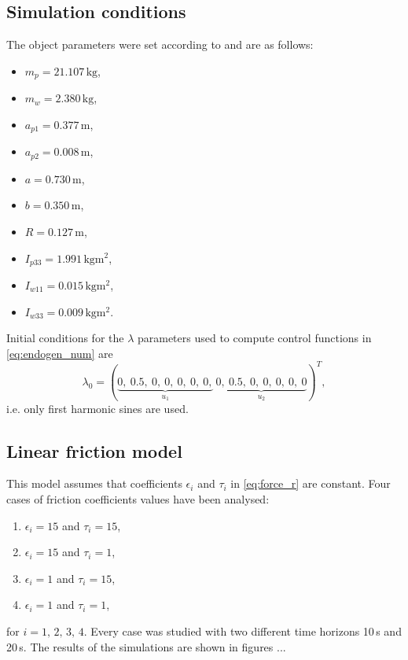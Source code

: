 \subsection{Simulation conditions}
\label{sec:pltf_params}
The object parameters were set according to \cite{coupled} and are as follows:
\begin{multicols}{2}
\begin{itemize}
\item $m_p = 21.107\,\mathrm{kg}$,
\item $m_w = 2.380\,\mathrm{kg}$,
\item $a_{p1} = 0.377\,\mathrm{m}$,
\item $a_{p2} = 0.008\,\mathrm{m}$,
\item $a = 0.730\,\mathrm{m}$,
\item $b = 0.350\,\mathrm{m}$,
\item $R = 0.127\,\mathrm{m}$,
\item $I_{p33} = 1.991\,\mathrm{kgm^2}$,
\item $I_{w11} = 0.015\,\mathrm{kgm^2}$,
\item $I_{w33} = 0.009\,\mathrm{kgm^2}$.
\end{itemize}
\end{multicols}
\setcounter{MaxMatrixCols}{14}
Initial conditions for the $\lambda$ parameters used to compute control functions
in \eqref{eq:endogen_num} are
\begin{equation}
\lambda_0=
(\underbrace{0, \ 0.5, \ 0, \ 0, \ 0, \ 0, \ 0,}_{u_1}\ \underbrace{0, \ 0.5, \ 0, \ 0, \ 0, \ 0, \ 0}_{u_2})^T,
\end{equation}
i.e. only first harmonic sines are used.
 	

\subsection{Linear friction model}
This model assumes that coefficients $\epsilon_i$ and $\tau_i$ in \eqref{eq:force_r} are constant. Four cases of friction coefficients values have been analysed:
\begin{enumerate}
\item $\epsilon_i=15$ and $\tau_i=15$,
\item $\epsilon_i=15$ and $\tau_i=1$,
\item $\epsilon_i=1$ and $\tau_i=15$,
\item $\epsilon_i=1$ and $\tau_i=1$,
\end{enumerate}
for $i=1,\,2,\,3,\,4$.
Every case was studied with two different time horizons 10\,s and 20\,s. The results of the simulations are shown in figures ...

